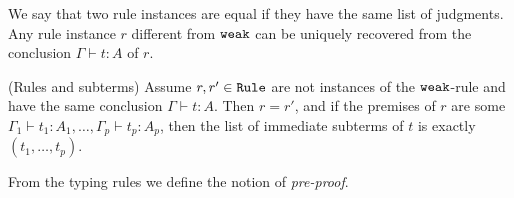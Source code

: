 
We say that two rule instances are equal if they have the same list of judgments. 
Any rule instance $r$ different from ${\tt weak}$ can be uniquely recovered from 
the conclusion $\Gamma \vdash t:A$ of $r$.

\begin{proposition}(Rules and subterms)\label{proposition-rules-subterms}
Assume $r, r' \in {\tt Rule}$ are not instances of the ${\tt weak}$-rule 
and have the same conclusion $\Gamma \vdash t:A$.
Then $r = r'$, and if the premises of $r$ are some 
$\Gamma_1 \vdash t_1:A_1, \ldots, \Gamma_p \vdash t_p:A_p$,
then the list of immediate subterms of $t$ is exactly $(t_1, \ldots, t_p)$.
\end{proposition}

From the typing rules we define the notion of \emph{pre-proof}. 


%


